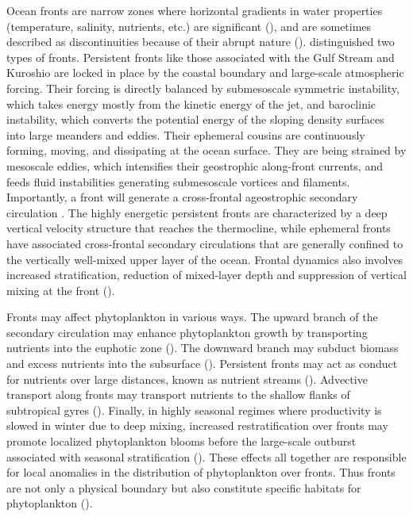 Ocean fronts are narrow zones where horizontal gradients in water properties (temperature, salinity, nutrients, etc.) are significant (\cite{belkin_2009a}), and are sometimes described as discontinuities because of their abrupt nature (\cite{mauzole_2022}).
\Textcite{levy_2018} distinguished two types of fronts. Persistent fronts like those associated with the Gulf Stream and Kuroshio are locked in place by the coastal boundary and large-scale atmospheric forcing.
Their forcing is directly balanced by submesoscale symmetric instability, which takes energy mostly from the kinetic energy of the jet, and baroclinic instability, which converts the potential energy of the sloping density surfaces into large meanders and eddies.
Their ephemeral cousins are continuously forming, moving, and dissipating at the ocean surface.
They are being strained by mesoscale eddies, which intensifies their geostrophic along-front currents, and feeds fluid instabilities generating submesoscale vortices and filaments.
Importantly, a front will generate a cross-frontal ageostrophic secondary circulation .
The highly energetic persistent fronts are characterized by a deep vertical velocity structure that reaches the thermocline, while ephemeral fronts have associated cross-frontal secondary circulations that are generally confined to the vertically well-mixed upper layer of the ocean.
Frontal dynamics also involves increased stratification, reduction of mixed-layer depth and suppression of vertical mixing at the front (\cite{thomas_2008a}).

Fronts may affect phytoplankton in various ways. The upward branch of the secondary circulation may enhance phytoplankton growth by transporting nutrients into the euphotic zone (\cite{johnson_2010, wilson_2021}).
The downward branch may subduct biomass and excess nutrients into the subsurface (\cite{calil_2011, omand_2015, hauschildt_2021}).
Persistent fronts may act as conduct for nutrients over large distances, known as nutrient streams (\cite{pelegri_1996, williams_2011a, long_2022}).
Advective transport along fronts may transport nutrients to the shallow flanks of subtropical gyres (\cite{letscher_2016, gupta_2022}).
Finally, in highly seasonal regimes where productivity is slowed in winter due to deep mixing, increased restratification over fronts may promote localized phytoplankton blooms before the large-scale outburst associated with seasonal stratification (\cite{mahadevan_2012}).
These effects all together are responsible for local anomalies in the distribution of phytoplankton over fronts.
Thus fronts are not only a physical boundary but also constitute specific habitats for phytoplankton (\cite{mangolte_2023}).

